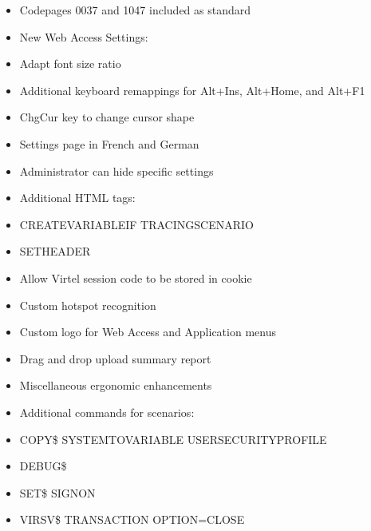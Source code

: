 \documentclass[letterpaper,10pt,english]{sphinxmanual}
\begin{document}
\begin{itemize}
\item {} 
\sphinxAtStartPar
Codepages 0037 and 1047 included as standard

\item {} 
\sphinxAtStartPar
New Web Access Settings:

\item {} 
\sphinxAtStartPar
Adapt font size ratio

\item {} 
\sphinxAtStartPar
Additional keyboard remappings for Alt+Ins, Alt+Home, and Alt+F1

\item {} 
\sphinxAtStartPar
ChgCur key to change cursor shape

\item {} 
\sphinxAtStartPar
Settings page in French and German

\item {} 
\sphinxAtStartPar
Administrator can hide specific settings

\item {} 
\sphinxAtStartPar
Additional HTML tags:

\item {} 
\sphinxAtStartPar
CREATE\sphinxhyphen{}VARIABLE\sphinxhyphen{}IF TRACING\sphinxhyphen{}SCENARIO

\item {} 
\sphinxAtStartPar
SET\sphinxhyphen{}HEADER

\item {} 
\sphinxAtStartPar
Allow Virtel session code to be stored in cookie

\item {} 
\sphinxAtStartPar
Custom hotspot recognition

\item {} 
\sphinxAtStartPar
Custom logo for Web Access and Application menus

\item {} 
\sphinxAtStartPar
Drag and drop upload summary report

\item {} 
\sphinxAtStartPar
Miscellaneous ergonomic enhancements

\end{itemize}

\sphinxAtStartPar
{}
\begin{itemize}
\item {} 
\sphinxAtStartPar
Additional commands for scenarios:

\item {} 
\sphinxAtStartPar
COPY\$ SYSTEM\sphinxhyphen{}TO\sphinxhyphen{}VARIABLE USER\sphinxhyphen{}SECURITY\sphinxhyphen{}PROFILE

\item {} 
\sphinxAtStartPar
DEBUG\$

\item {} 
\sphinxAtStartPar
SET\$ SIGNON

\item {} 
\sphinxAtStartPar
VIRSV\$ TRANSACTION OPTION=CLOSE

\end{itemize}
\end{document}

